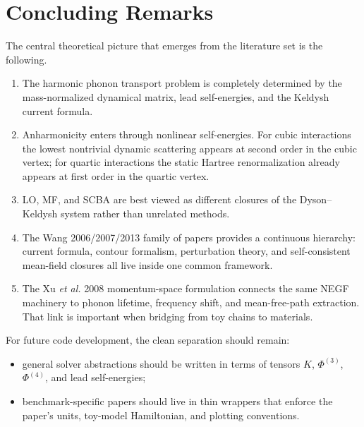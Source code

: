 \documentclass[11pt]{article}
\begin{document}
\section{Concluding Remarks}
The central theoretical picture that emerges from the literature set is the following.

\begin{enumerate}[label=\arabic*.]
\item The harmonic phonon transport problem is completely determined by the mass-normalized dynamical matrix, lead self-energies, and the Keldysh current formula.
\item Anharmonicity enters through nonlinear self-energies. For cubic interactions the lowest nontrivial dynamic scattering appears at second order in the cubic vertex; for quartic interactions the static Hartree renormalization already appears at first order in the quartic vertex.
\item LO, MF, and SCBA are best viewed as different closures of the Dyson--Keldysh system rather than unrelated methods.
\item The Wang 2006/2007/2013 family of papers provides a continuous hierarchy: current formula, contour formalism, perturbation theory, and self-consistent mean-field closures all live inside one common framework.
\item The Xu \emph{et al.} 2008 momentum-space formulation connects the same NEGF machinery to phonon lifetime, frequency shift, and mean-free-path extraction. That link is important when bridging from toy chains to materials.
\end{enumerate}

For future code development, the clean separation should remain:
\begin{itemize}
\item general solver abstractions should be written in terms of tensors $K$, $\Phi^{(3)}$, $\Phi^{(4)}$, and lead self-energies;
\item benchmark-specific papers should live in thin wrappers that enforce the paper's units, toy-model Hamiltonian, and plotting conventions.
\end{itemize}
\end{document}
